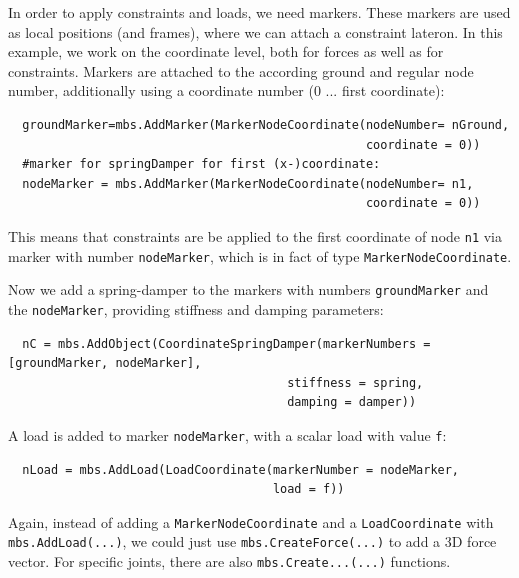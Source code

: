 In order to apply constraints and loads, we need markers. These markers are used as local positions (and frames), where we can attach a constraint lateron. In this example, we work on the coordinate level, both for forces as well as for constraints.
Markers are attached to the according ground and regular node number, additionally using a coordinate number (0 ... first coordinate):
\pythonstyle\begin{lstlisting}
  groundMarker=mbs.AddMarker(MarkerNodeCoordinate(nodeNumber= nGround, 
                                                  coordinate = 0))
  #marker for springDamper for first (x-)coordinate:
  nodeMarker = mbs.AddMarker(MarkerNodeCoordinate(nodeNumber= n1, 
                                                  coordinate = 0))
\end{lstlisting}
This means that constraints are be applied to the first coordinate of node \texttt{n1} via marker with number \texttt{nodeMarker}, which is in fact of type \texttt{MarkerNodeCoordinate}.

Now we add a spring-damper to the markers with numbers \texttt{groundMarker} and the \texttt{nodeMarker}, providing stiffness and damping parameters:
\pythonstyle\begin{lstlisting}
  nC = mbs.AddObject(CoordinateSpringDamper(markerNumbers = [groundMarker, nodeMarker], 
                                       stiffness = spring, 
                                       damping = damper)) 
\end{lstlisting}
%
A load is added to marker \texttt{nodeMarker}, with a scalar load with value \texttt{f}:
\pythonstyle\begin{lstlisting}
  nLoad = mbs.AddLoad(LoadCoordinate(markerNumber = nodeMarker, 
                                     load = f))
\end{lstlisting}
Again, instead of adding a \texttt{MarkerNodeCoordinate} and a \texttt{LoadCoordinate} with \texttt{mbs.AddLoad(...)},
we could just use \texttt{mbs.CreateForce(...)} to add a 3D force vector.
For specific joints, there are also \texttt{mbs.Create...(...)} functions.

